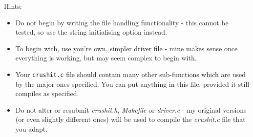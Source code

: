 \begin{exercise}
\noindent Hints:
\begin{itemize}
\item Do not begin by writing the file handling functionality -
this cannot be tested, so use the string initialising option
instead.
\item To begin with, use you're own, simpler driver file - mine
makes sense once everything is working, but may seem complex
to begin with.
\item Your \verb^crushit.c^ file should contain many other sub-functions
which are used by the major ones specified. You can put anything in this
file, provided it still compiles as specified.
\item Do not alter or resubmit {\em crushit.h}, {\em Makefile} or
{\em driver.c} - my original versions (or even slightly different
ones) will be used to compile the {\em crushit.c} file that you adapt.
\end{itemize}

\end{exercise}

